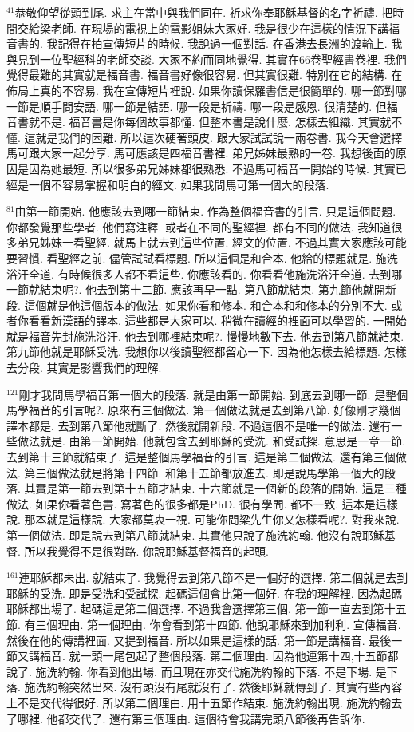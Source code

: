 \documentclass{book}
\begin{document}
$^{41}$恭敬仰望從頭到尾.
求主在當中與我們同在.
祈求你奉耶穌基督的名字祈禱.
把時間交給梁老師.
在現場的電視上的電影姐妹大家好.
我是很少在這樣的情況下講福音書的.
我記得在拍宣傳短片的時候.
我說過一個對話.
在香港去長洲的渡輪上.
我與見到一位聖經科的老師交談.
大家不約而同地覺得.
其實在66卷聖經書卷裡.
我們覺得最難的其實就是福音書.
福音書好像很容易.
但其實很難.
特別在它的結構.
在佈局上真的不容易.
我在宣傳短片裡說.
如果你讀保羅書信是很簡單的.
哪一節對哪一節是順手問安語.
哪一節是結語.
哪一段是祈禱.
哪一段是感恩.
很清楚的.
但福音書就不是.
福音書是你每個故事都懂.
但整本書是說什麼.
怎樣去組織.
其實就不懂.
這就是我們的困難.
所以這次硬著頭皮.
跟大家試試說一兩卷書.
我今天會選擇馬可跟大家一起分享.
馬可應該是四福音書裡.
弟兄姊妹最熟的一卷.
我想後面的原因是因為她最短.
所以很多弟兄姊妹都很熟悉.
不過馬可福音一開始的時候.
其實已經是一個不容易掌握和明白的經文.
如果我問馬可第一個大的段落.

$^{81}$由第一節開始.
他應該去到哪一節結束.
作為整個福音書的引言.
只是這個問題.
你都發覺那些學者.
他們寫注釋.
或者在不同的聖經裡.
都有不同的做法.
我知道很多弟兄姊妹一看聖經.
就馬上就去到這些位置.
經文的位置.
不過其實大家應該可能要習慣.
看聖經之前.
儘管試試看標題.
所以這個是和合本.
他給的標題就是.
施洗浴汗全道.
有時候很多人都不看這些.
你應該看的.
你看看他施洗浴汗全道.
去到哪一節就結束呢?.
他去到第十二節.
應該再早一點.
第八節就結束.
第九節他就開新段.
這個就是他這個版本的做法.
如果你看和修本.
和合本和和修本的分別不大.
或者你看看新漢語的譯本.
這些都是大家可以.
稍微在讀經的裡面可以學習的.
一開始就是福音先封施洗浴汗.
他去到哪裡結束呢?.
慢慢地數下去.
他去到第八節就結束.
第九節他就是耶穌受洗.
我想你以後讀聖經都留心一下.
因為他怎樣去給標題.
怎樣去分段.
其實是影響我們的理解.

$^{121}$剛才我問馬學福音第一個大的段落.
就是由第一節開始.
到底去到哪一節.
是整個馬學福音的引言呢?.
原來有三個做法.
第一個做法就是去到第八節.
好像剛才幾個譯本都是.
去到第八節他就斷了.
然後就開新段.
不過這個不是唯一的做法.
還有一些做法就是.
由第一節開始.
他就包含去到耶穌的受洗.
和受試探.
意思是一章一節.
去到第十三節就結束了.
這是整個馬學福音的引言.
這是第二個做法.
還有第三個做法.
第三個做法就是將第十四節.
和第十五節都放進去.
即是說馬學第一個大的段落.
其實是第一節去到第十五節才結束.
十六節就是一個新的段落的開始.
這是三種做法.
如果你看著色書.
寫著色的很多都是PhD.
很有學問.
都不一致.
這本是這樣說.
那本就是這樣說.
大家都莫衷一視.
可能你問梁先生你又怎樣看呢?.
對我來說.
第一個做法.
即是說去到第八節就結束.
其實他只說了施洗約翰.
他沒有說耶穌基督.
所以我覺得不是很對路.
你說耶穌基督福音的起頭.

$^{161}$連耶穌都未出.
就結束了.
我覺得去到第八節不是一個好的選擇.
第二個就是去到耶穌的受洗.
即是受洗和受試探.
起碼這個會比第一個好.
在我的理解裡.
因為起碼耶穌都出場了.
起碼這是第二個選擇.
不過我會選擇第三個.
第一節一直去到第十五節.
有三個理由.
第一個理由.
你會看到第十四節.
他說耶穌來到加利利.
宣傳福音.
然後在他的傳講裡面.
又提到福音.
所以如果是這樣的話.
第一節是講福音.
最後一節又講福音.
就一頭一尾包起了整個段落.
第二個理由.
因為他連第十四,十五節都說了.
施洗約翰.
你看到他出場.
而且現在亦交代施洗約翰的下落.
不是下場.
是下落.
施洗約翰突然出來.
沒有頭沒有尾就沒有了.
然後耶穌就傳到了.
其實有些內容上不是交代得很好.
所以第二個理由.
用十五節作結束.
施洗約翰出現.
施洗約翰去了哪裡.
他都交代了.
還有第三個理由.
這個待會我講完頭八節後再告訴你.
\end{document}
